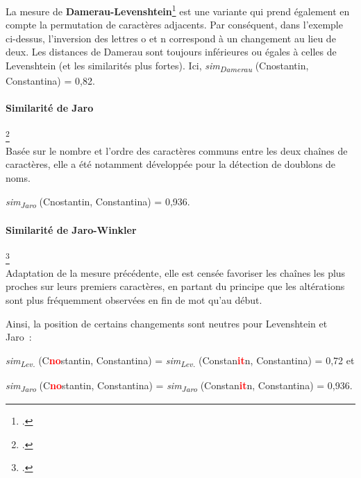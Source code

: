\documentclass[a4paper,12pt,twoside]{book}
\begin{document}
                
                La mesure de \textbf{Damerau-Levenshtein}\footcite{DistanceDamerauLevenshtein2020} est une variante qui prend également en compte la permutation de caractères adjacents. Par conséquent, dans l'exemple ci-dessus, l'inversion des lettres o et n correspond à un changement au lieu de deux. Les distances de Damerau sont toujours inférieures ou égales à celles de Levenshtein (et les similarités plus fortes). Ici, \textit{sim\textsubscript{Damerau}} (Cnostantin, Constantina) = 0,82.
                
                \paragraph{Similarité de Jaro}\footcite{DistanceJaroWinkler2021}\\
                
                Basée sur le nombre et l’ordre des caractères communs entre les deux chaînes de caractères, elle a été notamment développée pour la détection de doublons de noms.
                
                \textit{sim\textsubscript{Jaro}} (Cnostantin, Constantina) = 0,936.
                
                
                \paragraph{Similarité de Jaro-Winkler}\footcite{DistanceJaroWinkler2021} \\
                
                Adaptation de la mesure précédente, elle est censée favoriser les chaînes les plus proches sur leurs premiers caractères, en partant du principe que les altérations sont plus fréquemment observées en fin de mot qu'au début.
                
                Ainsi, la position de certains changements sont neutres pour Levenshtein et Jaro~:
                \vspace{0.2cm}
                
                \textit{sim\textsubscript{Lev.}} (C\textcolor{red}{\textbf{no}}stantin, Constantina)  =  \textit{sim\textsubscript{Lev.}} (Constan\textcolor{red}{\textbf{it}}n, Constantina) = 0,72 et
                \vspace{0.2cm}
                
                \textit{sim\textsubscript{Jaro}} (C\textcolor{red}{\textbf{no}}stantin, Constantina)  =  \textit{sim\textsubscript{Jaro}} (Constan\textcolor{red}{\textbf{it}}n, Constantina) = 0,936.
                \newline
                
\end{document}
